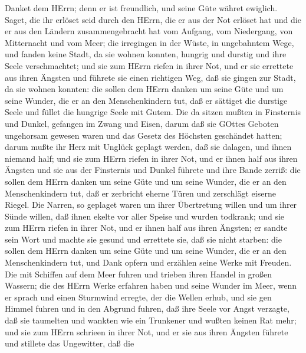  Danket dem HErrn; denn er ist freundlich, und seine Güte
währet ewiglich.  Saget, die ihr erlöset seid durch den
HErrn, die er aus der Not erlöset hat  und die er aus den
Ländern zusammengebracht hat vom Aufgang, vom Niedergang, von
Mitternacht und vom Meer;  die irregingen in der Wüste, in
ungebahntem Wege, und fanden keine Stadt, da sie wohnen konnten,
 hungrig und durstig und ihre Seele verschmachtet;
 und sie zum HErrn riefen in ihrer Not, und er sie errettete
aus ihren Ängsten  und führete sie einen richtigen Weg, daß
sie gingen zur Stadt, da sie wohnen konnten:  die sollen dem
HErrn danken um seine Güte und um seine Wunder, die er an den
Menschenkindern tut,  daß er sättiget die durstige Seele und
füllet die hungrige Seele mit Gutem.  Die da sitzen mußten
in Finsternis und Dunkel, gefangen im Zwang und Eisen, 
darum daß sie GOttes Geboten ungehorsam gewesen waren und das Gesetz des
Höchsten geschändet hatten;  darum mußte ihr Herz mit
Unglück geplagt werden, daß sie dalagen, und ihnen niemand half;
 und sie zum HErrn riefen in ihrer Not, und er ihnen half
aus ihren Ängsten  und sie aus der Finsternis und Dunkel
führete und ihre Bande zerriß:  die sollen dem HErrn danken
um seine Güte und um seine Wunder, die er an den Menschenkindern tut,
 daß er zerbricht eherne Türen und zerschlägt eiserne
Riegel.  Die Narren, so geplaget waren um ihrer Übertretung
willen und um ihrer Sünde willen,  daß ihnen ekelte vor
aller Speise und wurden todkrank;  und sie zum HErrn riefen
in ihrer Not, und er ihnen half aus ihren Ängsten;  er
sandte sein Wort und machte sie gesund und errettete sie, daß sie nicht
starben:  die sollen dem HErrn danken um seine Güte und um
seine Wunder, die er an den Menschenkindern tut,  und Dank
opfern und erzählen seine Werke mit Freuden.  Die mit
Schiffen auf dem Meer fuhren und trieben ihren Handel in großen Wassern;
 die des HErrn Werke erfahren haben und seine Wunder im
Meer,  wenn er sprach und einen Sturmwind erregte, der die
Wellen erhub,  und sie gen Himmel fuhren und in den Abgrund
fuhren, daß ihre Seele vor Angst verzagte,  daß sie
taumelten und wankten wie ein Trunkener und wußten keinen Rat mehr;
 und sie zum HErrn schrieen in ihrer Not, und er sie aus
ihren Ängsten führete  und stillete das Ungewitter, daß die
